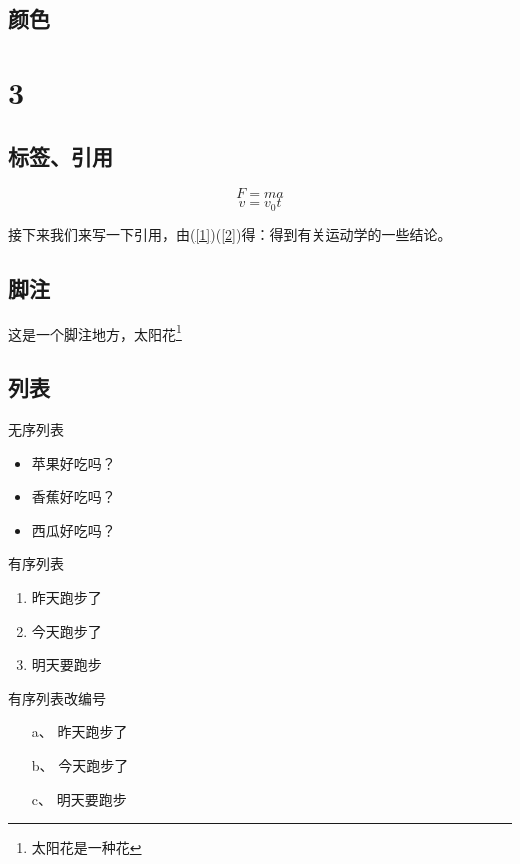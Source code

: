 \documentclass[10pt,UTF8]{ctexart}     %
\begin{document}
	\subsection{颜色}
	{\color{color1}{text}}   %
	{\color{blue}{text}}   %
	{\color{purple}{text}}   %
	
	\section{3}
	\subsection{标签、引用}
	
	\begin{equation}\label{1}  %
	F=ma
	\end{equation}
	\begin{equation}\label{2} 
	v=v_0 t
	\end{equation}
	
	接下来我们来写一下引用，由(\ref{1})(\ref{2})得：得到有关运动学的一些结论。

	\subsection{脚注}
	这是一个脚注地方，太阳花\footnote{太阳花是一种花}
	
	\subsection{列表}
	无序列表 
	\begin{itemize}
		\item 苹果好吃吗？
		\item 香蕉好吃吗？
		\item 西瓜好吃吗？
	\end{itemize}
	
	有序列表
	\begin{enumerate}
		\item 昨天跑步了
		\item 今天跑步了
		\item 明天要跑步
	\end{enumerate}
		有序列表改编号
	\begin{enumerate}
		\item[a、] 昨天跑步了
		\item[b、] 今天跑步了
		\item[c、] 明天要跑步
	\end{enumerate}
	
\end{document}
